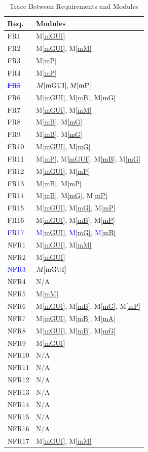 \documentclass[12pt, titlepage]{article}
\newcommand{\mref}[1]{M\ref{#1}}
\begin{document}
\begin{table}[H]
\centering
\begin{tabular}{p{} p{}}
\toprule
\textbf{Req.} & \textbf{Modules}\\
\midrule
FR1 & \mref{mGUI}\\
FR2 & \mref{mGUI}, \mref{mM}\\
FR3 & \mref{mP}\\
FR4 & \mref{mP}\\
\textcolor{blue}{\st{FR5}} & \textcolor{blue}{\st{$\mref{mGUI}, \mref{mP}$}}\\
FR6 & \mref{mGUI}, \mref{mB}, \mref{mG}\\
FR7 & \mref{mGUI}, \mref{mM}\\
FR8 & \mref{mB}, \mref{mG}\\
FR9 & \mref{mB}, \mref{mG}\\
FR10 & \mref{mGUI}, \mref{mG}\\
FR11 & \mref{mP}, \mref{mGUI}, \mref{mB}, \mref{mG}\\
FR12 & \mref{mGUI}, \mref{mP}\\
FR13 & \mref{mB}, \mref{mP}\\
FR14 & \mref{mB}, \mref{mG}, \mref{mP}\\
FR15 & \mref{mGUI}, \mref{mG}, \mref{mP}\\
FR16 & \mref{mGUI}, \mref{mB}, \mref{mP}\\
\textcolor{blue}{FR17} & \textcolor{blue}{\mref{mGUI}, \mref{mG}, \mref{mB}}\\
NFR1 & \mref{mGUI}, \mref{mM}\\
NFR2 & \mref{mGUI}\\
\textcolor{blue}{\st{NFR3}} & \textcolor{blue}{\st{$\mref{mGUI}$}}\\
NFR4 & N/A\\
NFR5 & \mref{mM}\\

NFR6 & \mref{mGUI}, \mref{mB}, \mref{mG}, \mref{mP}\\
NFR7 & \mref{mGUI}, \mref{mB}, \mref{mA}\\
NFR8 & \mref{mGUI}, \mref{mB}, \mref{mG}\\
NFR9 & \mref{mGUI}\\

NFR10 & N/A\\
NFR11 & N/A\\
NFR12 & N/A\\
NFR13 & N/A\\
NFR14 & N/A\\
NFR15 & N/A\\
NFR16 & N/A\\
NFR17 & \mref{mGUI}, \mref{mM}\\
\bottomrule
\end{tabular}
\caption{Trace Between Requirements and Modules}
\label{TblRT}
\end{table}
\end{document}
